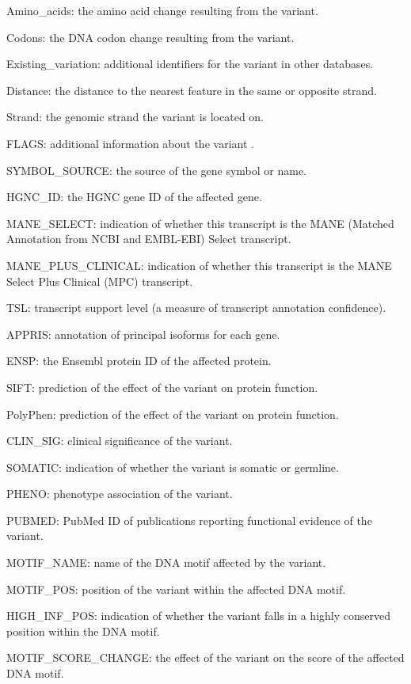 \documentclass[12pt,a4paper]{article}
\begin{document}
{Amino\_acids: the amino acid change resulting from the variant.}

{Codons: the DNA codon change resulting from the variant.}

{Existing\_variation: additional identifiers for the variant in other
databases.}

{Distance: the distance to the nearest feature in the same or opposite
strand.}

{Strand: the genomic strand the variant is located on.}

{FLAGS: additional information about the variant .}

{SYMBOL\_SOURCE: the source of the gene symbol or name.}

{HGNC\_ID: the HGNC gene ID of the affected gene.}

{MANE\_SELECT: indication of whether this transcript is the MANE
(Matched Annotation from NCBI and EMBL-EBI) Select transcript.}

{MANE\_PLUS\_CLINICAL: indication of whether this transcript is the MANE
Select Plus Clinical (MPC) transcript.}

{TSL: transcript support level (a measure of transcript annotation
confidence).}

{APPRIS: annotation of principal isoforms for each gene.}

{ENSP: the Ensembl protein ID of the affected protein.}

{SIFT: prediction of the effect of the variant on protein function.}

{PolyPhen: prediction of the effect of the variant on protein function.}

{CLIN\_SIG: clinical significance of the variant.}

{SOMATIC: indication of whether the variant is somatic or germline.}

{PHENO: phenotype association of the variant.}

{PUBMED: PubMed ID of publications reporting functional evidence of the
variant.}

{MOTIF\_NAME: name of the DNA motif affected by the variant.}

{MOTIF\_POS: position of the variant within the affected DNA motif.}

{HIGH\_INF\_POS: indication of whether the variant falls in a highly
conserved position within the DNA motif.}

{MOTIF\_SCORE\_CHANGE: the effect of the variant on the score of the
affected DNA motif.}
\end{document}
